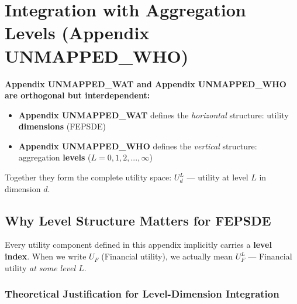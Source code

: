 \section{Integration with Aggregation Levels (Appendix UNMAPPED_WHO)}
\label{sec:app-c-aaa-integration}

\begin{tcolorbox}[colback=blue!5!white, colframe=blue!75!black, 
    title=Critical Integration: Appendix UNMAPPED_WAT $\times$ Appendix UNMAPPED_WHO]
\textbf{Appendix UNMAPPED_WAT and Appendix UNMAPPED_WHO are orthogonal but interdependent:}
\begin{itemize}[nosep]
\item \textbf{Appendix UNMAPPED_WAT} defines the \textit{horizontal} structure: utility \textbf{dimensions} (FEPSDE)
\item \textbf{Appendix UNMAPPED_WHO} defines the \textit{vertical} structure: aggregation \textbf{levels} ($L = 0, 1, 2, ..., \infty$)
\end{itemize}

Together they form the complete utility space: $U^L_d$ --- utility at level $L$ in dimension $d$.
\end{tcolorbox}

\subsection{Why Level Structure Matters for FEPSDE}

Every utility component defined in this appendix implicitly carries a \textbf{level index}. 
When we write $U_F$ (Financial utility), we actually mean $U^L_F$ --- Financial utility 
\textit{at some level $L$}.

\subsubsection{Theoretical Justification for Level-Dimension Integration}

